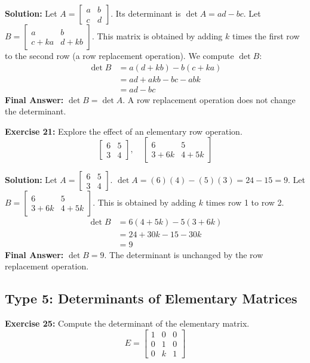 \documentclass{article}
\begin{document}
\textbf{Solution:}
Let $A = \begin{bmatrix} a & b \\ c & d \end{bmatrix}$. Its determinant is $\det A = ad - bc$.
Let $B = \begin{bmatrix} a & b \\ c+ka & d+kb \end{bmatrix}$. This matrix is obtained by adding $k$ times the first row to the second row (a row replacement operation).
We compute $\det B$:
\begin{align*}
\det B &= a(d+kb) - b(c+ka) \\
&= ad + akb - bc - abk \\
&= ad - bc
\end{align*}
\textbf{Final Answer:} $\det B = \det A$. A row replacement operation does not change the determinant.

\vspace{0.5cm}
\textbf{Exercise 21:} Explore the effect of an elementary row operation.
\[ \begin{bmatrix} 6 & 5 \\ 3 & 4 \end{bmatrix}, \quad \begin{bmatrix} 6 & 5 \\ 3+6k & 4+5k \end{bmatrix} \]

\textbf{Solution:}
Let $A = \begin{bmatrix} 6 & 5 \\ 3 & 4 \end{bmatrix}$. $\det A = (6)(4) - (5)(3) = 24 - 15 = 9$.
Let $B = \begin{bmatrix} 6 & 5 \\ 3+6k & 4+5k \end{bmatrix}$. This is obtained by adding $k$ times row 1 to row 2.
\begin{align*}
\det B &= 6(4+5k) - 5(3+6k) \\
&= 24 + 30k - 15 - 30k \\
&= 9
\end{align*}
\textbf{Final Answer:} $\det B = 9$. The determinant is unchanged by the row replacement operation.

\subsection{Type 5: Determinants of Elementary Matrices}

\textbf{Exercise 25:} Compute the determinant of the elementary matrix.
\[ E = \begin{bmatrix} 1 & 0 & 0 \\ 0 & 1 & 0 \\ 0 & k & 1 \end{bmatrix} \]
\end{document}
